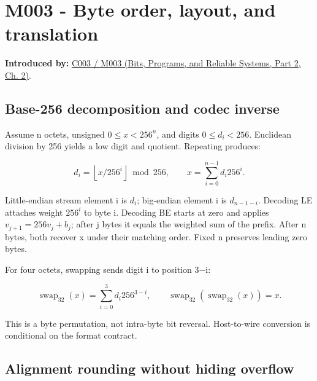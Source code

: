 \section{M003 - Byte order, layout, and translation}\label{03-visual-computing-i-ch018-m003---byte-order-layout-and-translation}

\hypertarget{03-visual-computing-i-ch018-m003---byte-order-layout-and-translation}{}

\textbf{Introduced by:} \href{../01-Bits-Programs-and-Reliable-Systems-P02/main.pdf\#01-foundations-i-ch002-where-the-bytes-live}{C003 / M003 (Bits, Programs, and Reliable Systems, Part 2, Ch. 2)}.

\subsection{Base-256 decomposition and codec inverse}\label{03-visual-computing-i-ch018-base-256-decomposition-and-codec-inverse}

\hypertarget{03-visual-computing-i-ch018-base-256-decomposition-and-codec-inverse}{}

Assume n octets, unsigned \(0\le x<256^n\), and digits \(0\le d_i<256\). Euclidean division by 256 yields a low digit and quotient. Repeating produces:

\[
d_i=\left\lfloor x/256^i\right\rfloor\bmod256,\qquad
x=\sum_{i=0}^{n-1}d_i256^i.
\]

Little-endian stream element i is \(d_i\); big-endian element i is \(d_{n-1-i}\). Decoding LE attaches weight \(256^i\) to byte i. Decoding BE starts at zero and applies \(v_{j+1}=256v_j+b_j\); after j bytes it equals the weighted sum of the prefix. After n bytes, both recover x under their matching order. Fixed n preserves leading zero bytes.

For four octets, swapping sends digit i to position 3−i:

\[
\operatorname{swap}_{32}(x)=\sum_{i=0}^{3}d_i256^{3-i},\qquad
\operatorname{swap}_{32}(\operatorname{swap}_{32}(x))=x.
\]

This is a byte permutation, not intra-byte bit reversal. Host-to-wire conversion is conditional on the format contract.

\subsection{Alignment rounding without hiding overflow}\label{03-visual-computing-i-ch018-alignment-rounding-without-hiding-overflow}

